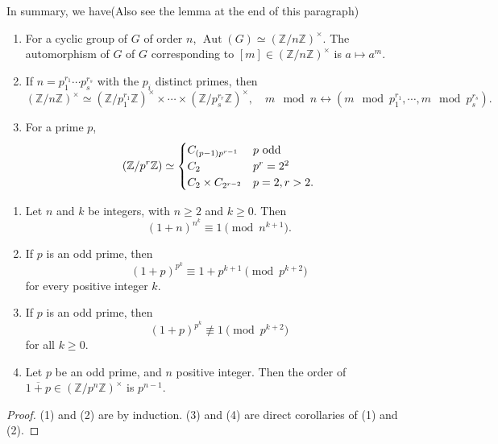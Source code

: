 In summary, we have(Also see the lemma at the end of this paragraph)
\begin{theorem}
  \begin{enumerate}
    \item For a cyclic group of \( G \) of order \( n \), \( \operatorname{Aut}(G) \simeq (\mathbb{Z} / n \mathbb{Z})^\times \).
      The automorphism of \( G \) of \( G \) corresponding to \( [m] \in (\mathbb{Z} / n\mathbb{Z})^{\times} \) is \( a \mapsto a^m \).
    \item If \( n = p^{r_1}_1 \cdots p^{r_s}_s \) with the \( p_i \) distinct primes, then
      \[
        (\mathbb{Z} / n\mathbb{Z})^\times \simeq (\mathbb{Z} / p^{r_1}_1\mathbb{Z})^\times \times \cdots \times (\mathbb{Z} / p_s^{r_r}\mathbb{Z})^\times,\quad m \mod{n} \leftrightarrow (m \mod{p_1^{r_1}}, \cdots, m \mod{p_s^{r_s}}).
      \]
    \item For a prime \( p \),
      \[
        (\mathbb{Z} / p^r \mathbb{Z}) \simeq \begin{cases}
          C_{(p - 1)p^{r - 1}} & p \textmd{ odd }\\
          C_2 & p^r = 2^2\\
          C_2 \times C_{2^{r - 2}} & p = 2, r > 2.
        \end{cases}
      \]
  \end{enumerate}
\end{theorem}
\begin{lemma}
  \begin{enumerate}
    \item Let \( n \) and \( k \) be integers, with \( n \geq 2 \) and \( k \geq 0 \).
      Then
      \[
        (1 + n)^{n^k} \equiv 1 \pmod{n^{k + 1}}.
      \]
    \item If \( p \) is an odd prime, then
      \[
        (1 + p)^{p^k} \equiv 1 + p^{k + 1} \pmod{p^{k + 2}}
      \]
      for every positive integer \( k \).
    \item If \( p \) is an odd prime, then
      \[
        (1 + p)^{p^k} \not\equiv 1 \pmod{p^{k + 2}}
      \]
      for all \( k \geq 0 \).
    \item Let \( p \) be an odd prime, and \( n \) positive integer.
      Then the order of \( \overline{1 + p} \in (\mathbb{Z} / p^{n}\mathbb{Z})^{\times} \) is \( p^{n - 1} \).
  \end{enumerate}
\end{lemma}
\begin{proof}
  (1) and (2) are by induction.
  (3) and (4) are direct corollaries of (1) and (2).
\end{proof}

